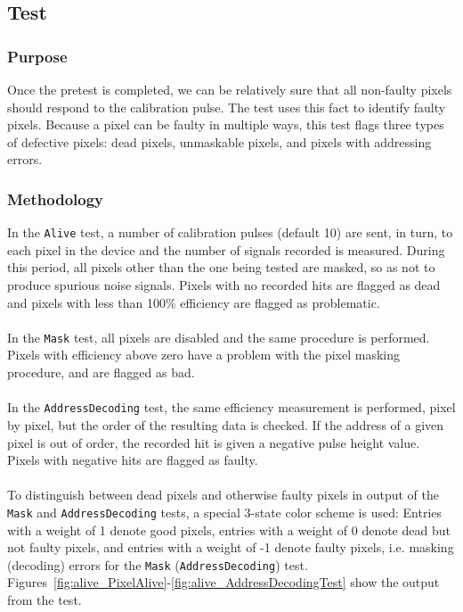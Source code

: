 
\newpage

\subsection{\alivetest Test}
\label{ss:alive}

\subsubsection{Purpose}

Once the pretest is completed, we can be relatively sure that all non-faulty pixels should respond to the calibration pulse.
The \alivetest test uses this fact to identify faulty pixels.
Because a pixel can be faulty in multiple ways, this test flags three types of defective pixels:
dead pixels, unmaskable pixels, and pixels with addressing errors.

\subsubsection{Methodology}

In the {\tt Alive} test, a number of calibration pulses (default 10) are sent, in turn,
to each pixel in the device and the number of signals recorded is measured.
During this period, all pixels other than the one being tested are masked, so as not to produce spurious noise signals.
Pixels with no recorded hits are flagged as dead and pixels with less than 100\% efficiency are flagged as problematic.
\\\\
In the {\tt Mask} test, all pixels are disabled and the same procedure is performed.
Pixels with efficiency above zero have a problem with the pixel masking procedure, and are flagged as bad.
\\\\
In the {\tt AddressDecoding} test, the same efficiency measurement is performed, pixel by pixel,
but the order of the resulting data is checked.
If the address of a given pixel is out of order, the recorded hit is given a negative pulse height value.
Pixels with negative hits are flagged as faulty.
\\\\
To distinguish between dead pixels and otherwise faulty pixels in output of the {\tt Mask} and {\tt AddressDecoding} tests, 
a special 3-state color scheme is used:  
Entries with a weight of 1 denote good pixels,
entries with a weight of 0 denote dead but not faulty pixels,
and entries with a weight of -1 denote faulty pixels, i.e. masking (decoding) errors for the {\tt Mask} ({\tt AddressDecoding}) test.
Figures~\ref{fig:alive_PixelAlive}-\ref{fig:alive_AddressDecodingTest} show the output from the \alivetest test.

